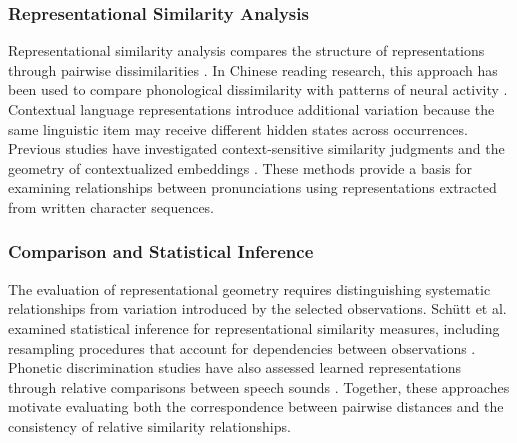 \subsubsection{Representational Similarity Analysis}
\label{sec:lr-rsa}

Representational similarity analysis compares the structure of representations
through pairwise dissimilarities \cite{ref_kriegeskorte2008}. In Chinese reading
research, this approach has been used to compare phonological dissimilarity with
patterns of neural activity \cite{ref_li_chinese2022}. Contextual language
representations introduce additional variation because the same linguistic item
may receive different hidden states across occurrences. Previous studies have
investigated context-sensitive similarity judgments and the geometry of
contextualized embeddings \cite{ref_huang2012,ref_ethayarajh2019}. These methods
provide a basis for examining relationships between pronunciations using
representations extracted from written character sequences.

\subsubsection{Comparison and Statistical Inference}
\label{sec:lr-inference}

The evaluation of representational geometry requires distinguishing systematic
relationships from variation introduced by the selected observations. Schütt et
al. examined statistical inference for representational similarity measures,
including resampling procedures that account for dependencies between
observations \cite{ref_schutt2023}. Phonetic discrimination studies have also
assessed learned representations through relative comparisons between speech
sounds \cite{ref_matusevych2023}. Together, these approaches motivate evaluating
both the correspondence between pairwise distances and the consistency of
relative similarity relationships.
